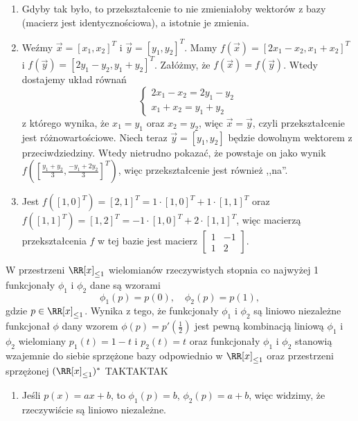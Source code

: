 \begin{solutions}
    \begin{enumerate}[\bf A.]
        \item Gdyby tak było, to przekształcenie to nie zmieniałoby wektorów z bazy (macierz jest identycznościowa), a istotnie je zmienia.

        \item Weźmy $\vec{x}=[x_1,x_2]^T$ i $\vec{y}=[y_1,y_2]^T$. Mamy $f(\vec{x})=[2x_1-x_2,x_1+x_2]^T$ i $f(\vec{y})=[2y_1-y_2,y_1+y_2]^T$. Załóżmy, że $f(\vec{x})=f(\vec{y})$. Wtedy dostajemy układ równań
        $$
        \begin{cases}
            2x_1-x_2 = 2y_1-y_2 \\
            x_1+x_2 = y_1+y_2
        \end{cases}
        $$
        z którego wynika, że $x_1=y_1$ oraz $x_2=y_2$, więc $\vec{x}=\vec{y}$, czyli przekształcenie jest różnowartościowe. Niech teraz $\vec{y}=[y_1,y_2]$ będzie dowolnym wektorem z przeciwdziedziny. Wtedy nietrudno pokazać, że powstaje on jako wynik $f([\frac{y_1+y_2}{3},\frac{-y_1+2y_2}{3}]^T)$, więc przekształcenie jest również ,,na''.

        \item Jest $f([1,0]^T)=[2,1]^T=1\cdot[1,0]^T+1\cdot[1,1]^T$ oraz $f([1,1]^T)=[1,2]^T=-1\cdot[1,0]^T+2\cdot[1,1]^T$, więc macierzą przekształcenia $f$ w tej bazie jest macierz $\begin{bmatrix}1 & -1 \\ 1 & 2\end{bmatrix}$.
    \end{enumerate}

    \sol W przestrzeni $\RR[x]_{\leq 1}$ wielomianów rzeczywistych stopnia co najwyżej 1 funkcjonały $\phi_1$ i $\phi_2$ dane są wzorami 
    $$
    \phi_1(p) = p(0), \quad \phi_2(p) = p(1),
    $$
    gdzie $p \in \RR[x]_{\leq 1}$. Wynika z tego, że
    \answerss
    {funkcjonały $\phi_1$ i $\phi_2$ są liniowo niezależne}
    {funkcjonał $\phi$ dany wzorem $\phi(p) = p'(\frac{1}{2})$ jest pewną kombinacją liniową $\phi_1$ i $\phi_2$}
    {wielomiany $p_1(t) = 1-t$ i $p_2(t) = t$ oraz funkcjonały $\phi_1$ i $\phi_2$ stanowią wzajemnie do siebie sprzężone bazy odpowiednio w $\RR[x]_{\leq 1}$ oraz przestrzeni sprzężonej $(\RR[x]_{\leq 1})^*$}
    {TAK}{TAK}{TAK}

    \begin{enumerate}[\bf A.]
        \item Jeśli $p(x)=ax+b$, to $\phi_1(p)=b$, $\phi_2(p)=a+b$, więc widzimy, że rzeczywiście są liniowo niezależne.


\end{enumerate}
\end{solutions}
